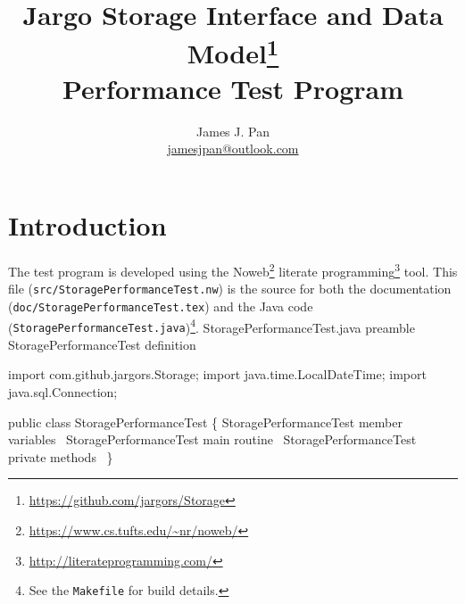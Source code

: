 \documentclass{article}
\title{Jargo Storage Interface
  and Data Model\footnote{\url{https://github.com/jargors/Storage}}\\
  \vspace{.5em}
  \Large{\textbf{Performance Test Program}}}
\author{James J. Pan\\
  \small{\href{mailto:jamesjpan@outlook.com}{jamesjpan@outlook.com}}
}
\def\nwendcode{\endtrivlist \endgroup}
\let\nwdocspar=\par
\begin{document}
\maketitle
\pagestyle{noweb}


\tableofcontents

\section{Introduction}
\label{sec:introduction}
The test program is developed using the
Noweb\footnote{\url{https://www.cs.tufts.edu/~nr/noweb/}} literate
programming\footnote{\url{http://literateprogramming.com/}} tool.  This file
({\tt{}src/StoragePerformanceTest.nw}) is the source for both the documentation
({\tt{}doc/StoragePerformanceTest.tex}) and the Java code
({\tt{}StoragePerformanceTest.java})\footnote{See the {\tt{}Makefile} for build
details.}.
\endmoddef{}
\LA{}StoragePerformanceTest.java preamble~{\nwtagstyle{}}\RA{}
\LA{}\code{}StoragePerformanceTest\edoc{} definition~{\nwtagstyle{}}\RA{}
\nwendcode{}\nwdocspar

\nwenddocs{}\endmoddef{}
import com.github.jargors.Storage;
import java.time.LocalDateTime;
import java.sql.Connection;
\nwendcode{}\nwdocspar

\nwenddocs{}\endmoddef{}
public class StoragePerformanceTest \{
  \LA{}\code{}StoragePerformanceTest\edoc{} member variables~{\nwtagstyle{}}\RA{}
  \LA{}\code{}StoragePerformanceTest\edoc{} main routine~{\nwtagstyle{}}\RA{}
  \LA{}\code{}StoragePerformanceTest\edoc{} private methods~{\nwtagstyle{}}\RA{}
\}
\nwendcode{}\nwdocspar
\nwenddocs{}\endmoddef{}
\nwendcode{}%
\end{document}
